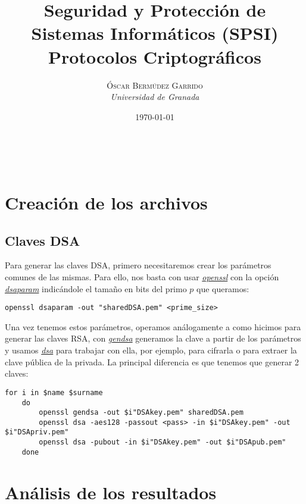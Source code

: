 \documentclass[a4paper, 11pt]{article}
\title{\textbf{Seguridad y Protección de Sistemas Informáticos (SPSI)}\\ %
Protocolos Criptográficos} %
\author{\textsc{Óscar Bermúdez Garrido} %
\\{\textit{Universidad de Granada}}} %
\date{\today} %
\makeatletter
\renewcommand{\maketitle}{
  \begin{flushright} %
  
  {\LARGE\@title} %
  
  \vspace{50pt} %
  
  {\large\@author} %
  \\\@date %
  \vspace{40pt} %
  \end{flushright}
}
\makeatother
\begin{document}
\maketitle %

\renewcommand{\abstractname}{Resumen} %

{\parskip=2pt
  \tableofcontents
}
\pagebreak


\section{Creación de los archivos}
	\subsection{Claves DSA}
		Para generar las claves DSA, primero necesitaremos crear los parámetros comunes de las mismas. Para ello, nos basta
		con usar \href{http://manpages.ubuntu.com/manpages/zesty/en/man1/openssl.1ssl.html}{\textit{openssl}} con la opción
		\href{https://www.openssl.org/docs/man1.0.2/apps/dsaparam.html}{\textit{dsaparam}} indicándole el tamaño en bits del
		primo $p$ que queramos:
		\begin{small}
			\verb|openssl dsaparam -out "sharedDSA.pem" <prime_size>|
		\end{small}

		Una vez tenemos estos parámetros, operamos análogamente a como hicimos para generar las claves RSA, con
		\href{https://www.openssl.org/docs/man1.0.2/apps/gendsa.html}{\textit{gendsa}} generamos la clave a partir de los
		parámetros y usamos \href{https://www.openssl.org/docs/man1.0.2/apps/dsa.html}{\textit{dsa}} para trabajar con ella,
		por ejemplo, para cifrarla o para extraer la clave pública de la privada. La principal diferencia es que tenemos que
		generar 2 claves:

		\begin{small}
			\verb|for i in $name $surname| \\
			\verb|    do| \\
			\verb|        openssl gendsa -out $i"DSAkey.pem" sharedDSA.pem| \\
			\verb|        openssl dsa -aes128 -passout <pass> -in $i"DSAkey.pem" -out $i"DSApriv.pem"| \\
			\verb|        openssl dsa -pubout -in $i"DSAkey.pem" -out $i"DSApub.pem"| \\
			\verb|    done| \\
		\end{small}
    	
\section{Análisis de los resultados}
	
\end{document}
